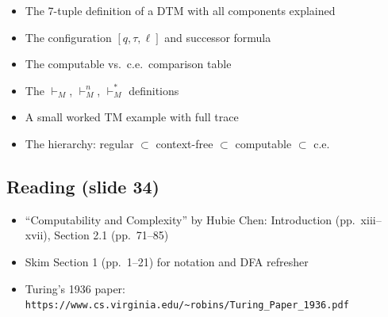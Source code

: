 \documentclass[11pt,a4paper]{article}
\begin{document}
\begin{itemize}[nosep]
\item The 7-tuple definition of a DTM with all components explained
\item The configuration $[q, \tau, \ell]$ and successor formula
\item The computable vs.\ c.e.\ comparison table
\item The $\vdash_M$, $\vdash_M^n$, $\vdash_M^*$ definitions
\item A small worked TM example with full trace
\item The hierarchy: regular $\subset$ context-free $\subset$ computable $\subset$ c.e.
\end{itemize}

\subsection{Reading (slide 34)}
\begin{itemize}[nosep]
\item ``Computability and Complexity'' by Hubie Chen: Introduction (pp.\ xiii--xvii), Section 2.1 (pp.\ 71--85)
\item Skim Section 1 (pp.\ 1--21) for notation and DFA refresher
\item Turing's 1936 paper: \texttt{https://www.cs.virginia.edu/\textasciitilde robins/Turing\_Paper\_1936.pdf}
\end{itemize}
\end{document}
